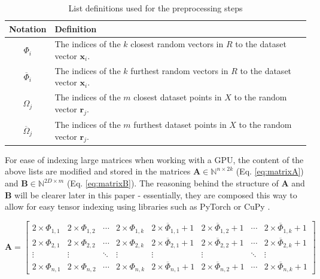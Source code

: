 \documentclass{article}
\newcommand{\brj}{\mathbf{r}_{j}}
\newcommand{\bxi}{\mathbf{x}_{i}}
\newcommand{\bA}{\mathbf{A}}
\newcommand{\bB}{\mathbf{B}}
\newcommand{\phiCi}{\Phi_i}
\newcommand{\phiFi}{\overline{\Phi}_i}
\newcommand{\fPhiCi}[2]{\Phi_{#1,#2}}
\newcommand{\fPhiFi}[2]{\overline{\Phi}_{#1,#2}}
\newcommand{\omegaCj}{\Omega_j}
\newcommand{\omegaFj}{\overline{\Omega}_j}
\begin{document}
\renewcommand{\arraystretch}{1.3} %

\begin{table}[H]
    \centering
    \begin{tabular}{|c|l|}
    \hline
    \textbf{Notation} & \textbf{Definition} \\ 
    \hline
    $\phiCi$ & The indices of the $k$ closest random vectors in $R$ to the dataset vector $\bxi$. \\ 
    \hline
    $\phiFi$ & The indices of the $k$ furthest random vectors in $R$ to the dataset vector $\bxi$. \\ 
    \hline
    $\omegaCj$ & The indices of the $m$ closest dataset points in $X$ to the random vector $\brj$. \\ 
    \hline
    $\omegaFj$ & The indices of the $m$  furthest dataset points in $X$ to the random vector $\brj$. \\ 
    \hline
    \end{tabular}
    \caption{List definitions used for the preprocessing steps}
    \label{tab:index-lists}
\end{table}

For ease of indexing large matrices when working with a GPU, the content of the above lists are modified and stored in the matrices $\bA \in \mathbb{N}^{n \times 2k}$ (Eq. \ref{eq:matrixA}) and $\bB  \in \mathbb{N}^{2D \times m}$ (Eq. \ref{eq:matrixB}). The reasoning behind the structure of $\bA$ and $\bB$ will be clearer later in this paper - essentially, they are composed this way to allow for easy tensor indexing using libraries such as PyTorch \cite{Ansel_PyTorch_2_Faster_2024} or CuPy \cite{cupy_learningsys2017}. 

\begin{equation}
\bA = \begin{bmatrix}
2 \times \fPhiCi{1}{1} & 2 \times\fPhiCi{1}{2} & \cdots & 2 \times\fPhiCi{1}{k} & 2 \times\fPhiFi{1}{1} + 1 & 2 \times\fPhiFi{1}{2} + 1 & \cdots & 2 \times \fPhiFi{1}{k} + 1 \\
2 \times \fPhiCi{2}{1} & 2 \times\fPhiCi{2}{2} & \cdots & 2 \times\fPhiCi{2}{k} & 2 \times\fPhiFi{2}{1} + 1 & 2 \times\fPhiFi{2}{2} + 1 & \cdots & 2 \times \fPhiFi{2}{k} + 1 \\
\vdots & \vdots & \ddots & \vdots & \vdots & \vdots & \ddots & \vdots \\
2 \times \fPhiCi{n}{1} & 2 \times \fPhiCi{n}{2} & \cdots & 2 \times\fPhiCi{n}{k} & 2 \times\fPhiFi{n}{1} + 1 & 2 \times\fPhiFi{n}{2} + 1 & \cdots & 2 \times \fPhiFi{n}{k} + 1
\end{bmatrix}
\label{eq:matrixA}
\end{equation}
\end{document}
